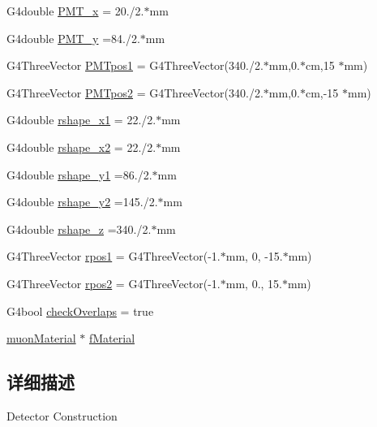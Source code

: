 \begin{DoxyCompactItemize}
\item 
G4double \hyperlink{classmuonDetectorConstruction_a59743f64bbef89ed64aef6c699529d06}{P\+M\+T\+\_\+x} = 20./2.$\ast$mm
\item 
G4double \hyperlink{classmuonDetectorConstruction_a9574fc8ddbc472645c91a5be868f46b2}{P\+M\+T\+\_\+y} =84./2.$\ast$mm
\item 
G4\+Three\+Vector \hyperlink{classmuonDetectorConstruction_aae5093d6de44702c9799fdf41302b732}{P\+M\+Tpos1} = G4\+Three\+Vector(340./2.$\ast$mm,0.$\ast$cm,15 $\ast$mm)
\item 
G4\+Three\+Vector \hyperlink{classmuonDetectorConstruction_ac60e3fd7868c15c3f5f351d4e064a1b5}{P\+M\+Tpos2} = G4\+Three\+Vector(340./2.$\ast$mm,0.$\ast$cm,-\/15 $\ast$mm)
\item 
G4double \hyperlink{classmuonDetectorConstruction_ad5f560a56957f9d7a4d2b32a67130dd7}{rshape\+\_\+x1} = 22./2.$\ast$mm
\item 
G4double \hyperlink{classmuonDetectorConstruction_a03e92841ed58214bff5548ba39bece65}{rshape\+\_\+x2} = 22./2.$\ast$mm
\item 
G4double \hyperlink{classmuonDetectorConstruction_a6a5656686c94f5526260dc6ff5bab1c2}{rshape\+\_\+y1} =86./2.$\ast$mm
\item 
G4double \hyperlink{classmuonDetectorConstruction_a7f7450b63b08b56eb4e510bb10407d00}{rshape\+\_\+y2} =145./2.$\ast$mm
\item 
G4double \hyperlink{classmuonDetectorConstruction_a829a6697c7a0d736f54ef2cc1726e998}{rshape\+\_\+z} =340./2.$\ast$mm
\item 
G4\+Three\+Vector \hyperlink{classmuonDetectorConstruction_a3a49ae955ac065b568c7db42c570cd75}{rpos1} = G4\+Three\+Vector(-\/1.$\ast$mm, 0, -\/15.$\ast$mm)
\item 
G4\+Three\+Vector \hyperlink{classmuonDetectorConstruction_a95836d910644b3c728b3fe4c0d2bdc28}{rpos2} = G4\+Three\+Vector(-\/1.$\ast$mm, 0., 15.$\ast$mm)
\item 
G4bool \hyperlink{classmuonDetectorConstruction_a32d68e577a2dd250cce61acae6389557}{check\+Overlaps} = true
\item 
\hyperlink{classmuonMaterial}{muon\+Material} $\ast$ \hyperlink{classmuonDetectorConstruction_a826aea0d097deb692b12aed2149f622b}{f\+Material}
\end{DoxyCompactItemize}


\subsection{详细描述}
Detector Construction 

